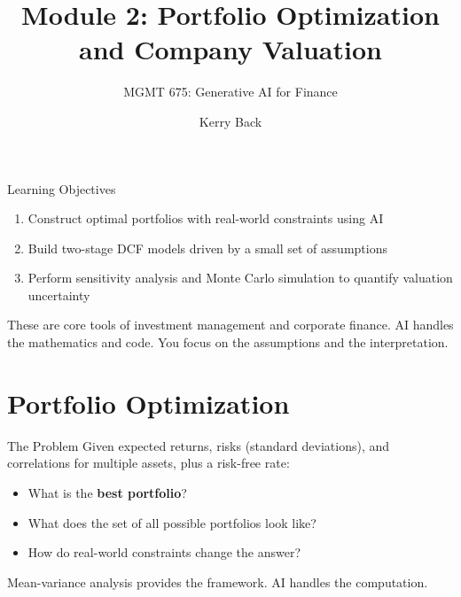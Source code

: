 \documentclass[aspectratio=169]{beamer}
\subtitle{MGMT 675: Generative AI for Finance}
\title{Module 2: Portfolio Optimization and Company Valuation}
\author{Kerry Back}
\date{}
\begin{document}
\maketitle

\begin{frame}{Learning Objectives}
\begin{enumerate}
  \item Construct optimal portfolios with real-world constraints using AI
  \item Build two-stage DCF models driven by a small set of assumptions
  \item Perform sensitivity analysis and Monte Carlo simulation to quantify valuation uncertainty
\end{enumerate}

\vspace{0.5cm}
These are core tools of investment management and corporate finance.  AI handles the mathematics and code.  \alert{You focus on the assumptions and the interpretation.}
\end{frame}

\section{Portfolio Optimization}

\begin{frame}{The Problem}
Given expected returns, risks (standard deviations), and correlations for multiple assets, plus a risk-free rate:

\begin{itemize}
  \item What is the \textbf{best portfolio}?
  \item What does the set of all possible portfolios look like?
  \item How do real-world constraints change the answer?
\end{itemize}

\vspace{0.3cm}
Mean-variance analysis provides the framework.  AI handles the computation.
\end{frame}
\end{document}
